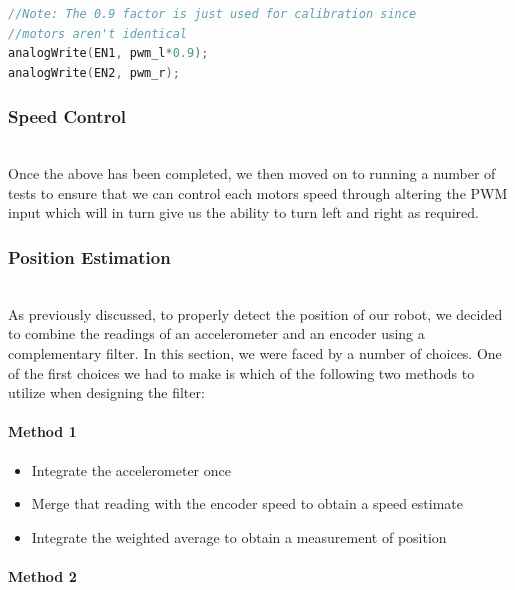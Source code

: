 \documentclass[conference]{IEEEtran}
\begin{document}
\begin{lstlisting}[language=C++, caption=Wheel Calibration Code]
//Note: The 0.9 factor is just used for calibration since 
//motors aren't identical
analogWrite(EN1, pwm_l*0.9);  
analogWrite(EN2, pwm_r);\end{lstlisting}

    \subsubsection{Speed Control}

    ~~\\Once the above has been completed, we then moved on to running a number
    of tests to ensure that we can control each motors speed through altering
    the PWM input which will in turn give us the ability to turn left and right
    as required.\\

    \subsubsection{Position Estimation}

    ~~\\As previously discussed, to properly detect the position of our robot,
    we decided to combine the readings of an accelerometer and an encoder using
    a complementary filter. In this section, we were faced by a number of choices.
    One of the first choices we had to make is which of the following two methods
    to utilize when designing the filter:\\

    \paragraph{Method 1}

    \begin{itemize}
        \item Integrate the accelerometer once
        \item Merge that reading with the encoder speed to obtain a speed estimate
        \item Integrate the weighted average to obtain a measurement of position\\
    \end{itemize}

    \paragraph{Method 2}
\end{document}
